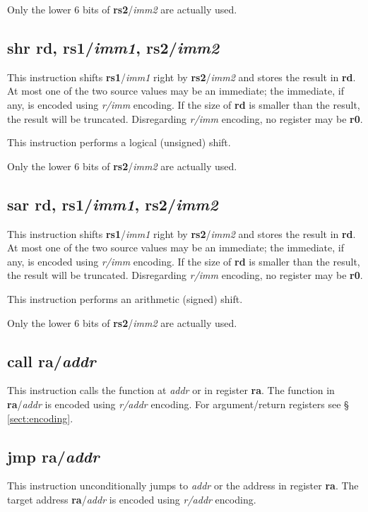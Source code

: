 \documentclass[12pt, a4paper, oneside, final]{article}
\def\i#1{\textcolor{icolour}{\bfseries#1}}
\def\r#1{\textcolor{rcolour}{\bfseries r#1}}
\begin{document}
Only the lower 6 bits of \r{s2}/\textit{imm2} are actually used.

\subsection{\i{shr} \r{d}, \r{s1}/\textit{imm1}, \r{s2}/\textit{imm2}}
This instruction shifts \r{s1}/\textit{imm1} right by \r{s2}/\textit{imm2} and stores the result in
\r{d}. At most one of the two source values may be an immediate; the immediate, if any, is encoded
using \textit{r/imm} encoding. If the size of \r{d} is smaller than the result, the result will be
truncated. Disregarding \textit{r/imm} encoding, no register may be \r{0}.

This instruction performs a logical (unsigned) shift.

Only the lower 6 bits of \r{s2}/\textit{imm2} are actually used.

\subsection{\i{sar} \r{d}, \r{s1}/\textit{imm1}, \r{s2}/\textit{imm2}}
This instruction shifts \r{s1}/\textit{imm1} right by \r{s2}/\textit{imm2} and stores the result in
\r{d}. At most one of the two source values may be an immediate; the immediate, if any, is encoded
using \textit{r/imm} encoding. If the size of \r{d} is smaller than the result, the result will be
truncated. Disregarding \textit{r/imm} encoding, no register may be \r{0}.

This instruction performs an arithmetic (signed) shift.

Only the lower 6 bits of \r{s2}/\textit{imm2} are actually used.

\subsection{\i{call} \r{a}/\textit{addr}}
This instruction calls the function at \textit{addr} or in register \r{a}. The function in
\r{a}/\textit{addr} is encoded using \textit{r/addr} encoding. For argument/return registers see §
\ref{sect:encoding}.

\subsection{\i{jmp} \r{a}/\textit{addr}}
This instruction unconditionally jumps to \textit{addr} or the address in register \r{a}. The target
address \r{a}/\textit{addr} is encoded using \textit{r/addr} encoding.
\end{document}
